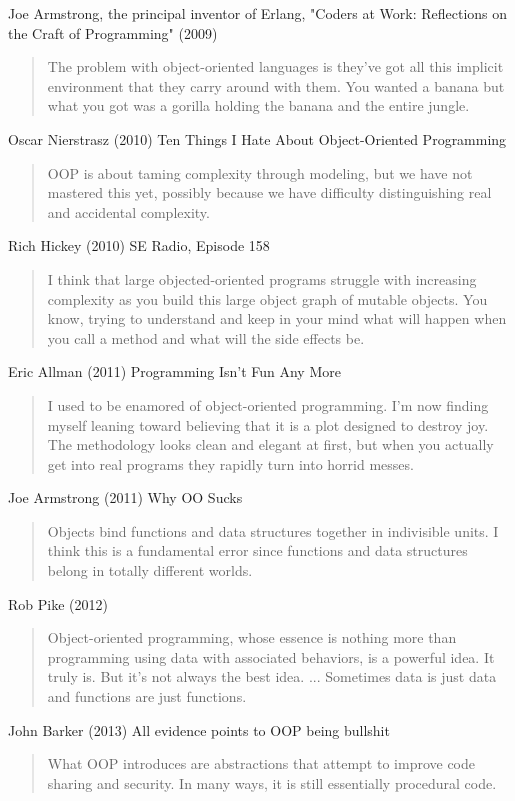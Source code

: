 \documentclass[12pt]{book}
\begin{document}
Joe Armstrong, the principal inventor of Erlang, "Coders at Work: Reflections on the Craft of Programming" (2009)
\begin{quote}
	The problem with object-oriented languages is they've got all this implicit environment that they carry around with them. 
	You wanted a banana but what you got was a gorilla holding the banana and the entire jungle.
\end{quote}

Oscar Nierstrasz (2010)
Ten Things I Hate About Object-Oriented Programming
\begin{quote}
	OOP is about taming complexity through modeling, but we have not mastered this yet, possibly because we have difficulty distinguishing real and accidental complexity.
\end{quote}

Rich Hickey (2010)
SE Radio, Episode 158
\begin{quote}
	I think that large objected-oriented programs struggle with increasing complexity as you build this large object graph of mutable objects. You know, trying to understand and keep in your mind what will happen when you call a method and what will the side effects be.
\end{quote}

Eric Allman (2011)
Programming Isn't Fun Any More
\begin{quote}
	I used to be enamored of object-oriented programming. I'm now finding myself leaning toward believing that it is a plot designed to destroy joy. The methodology looks clean and elegant at first, but when you actually get into real programs they rapidly turn into horrid messes.
\end{quote}

Joe Armstrong (2011)
Why OO Sucks
\begin{quote}
	Objects bind functions and data structures together in indivisible units. I think this is a fundamental error since functions and data structures belong in totally different worlds.
\end{quote}

Rob Pike (2012)
\begin{quote}
	Object-oriented programming, whose essence is nothing more than programming using data with associated behaviors, is a powerful idea. It truly is. But it's not always the best idea. ... Sometimes data is just data and functions are just functions.
\end{quote}

John Barker (2013)
All evidence points to OOP being bullshit
\begin{quote}
	What OOP introduces are abstractions that attempt to improve code sharing and security. In many ways, it is still essentially procedural code.
\end{quote}
\end{document}
